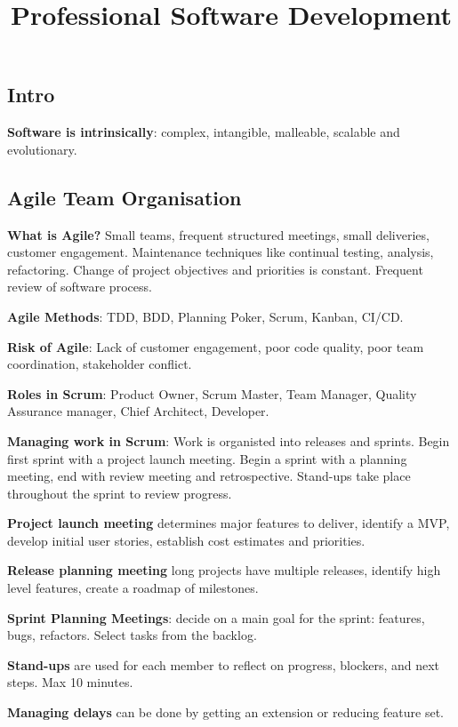 \documentclass{article}
\title{Professional Software Development}
\author{}
\date{}
\begin{document}
\footnotesize

\subsection*{Intro}

\noindent \textbf{Software is intrinsically}: complex, intangible, malleable, scalable and evolutionary.


\subsection*{Agile Team Organisation}

\noindent \textbf{What is Agile?} Small teams, frequent structured meetings, small deliveries, customer engagement.
Maintenance techniques like continual testing, analysis, refactoring.
Change of project objectives and priorities is constant.
Frequent review of software process.

\noindent \textbf{Agile Methods}: TDD, BDD, Planning Poker, Scrum, Kanban, CI/CD.\@

\noindent \textbf{Risk of Agile}: Lack of customer engagement, poor code quality, poor team coordination, stakeholder conflict.

\noindent \textbf{Roles in Scrum}: Product Owner, Scrum Master, Team Manager, Quality Assurance manager, Chief Architect, Developer.

\noindent \textbf{Managing work in Scrum}: Work is organisted into releases and sprints.
Begin first sprint with a project launch meeting.
Begin a sprint with a planning meeting, end with review meeting and retrospective.
Stand-ups take place throughout the sprint to review progress.

\noindent \textbf{Project launch meeting} determines major features to deliver, identify a MVP, develop initial user stories,
establish cost estimates and priorities.

\noindent \textbf{Release planning meeting} long projects have multiple releases, identify high level features, create a roadmap of milestones.

\noindent \textbf{Sprint Planning Meetings}: decide on a main goal for the sprint: features, bugs, refactors. Select tasks from the backlog.

\noindent \textbf{Stand-ups} are used for each member to reflect on progress, blockers, and next steps. Max 10 minutes.

\noindent \textbf{Managing delays} can be done by getting an extension or reducing feature set.
\end{document}
